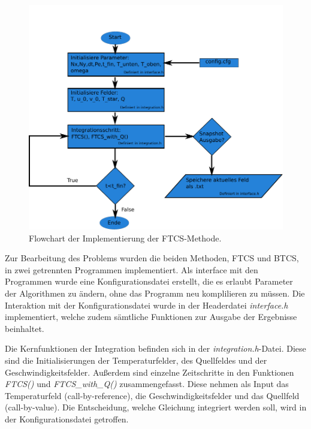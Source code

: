 \begin{figure}\centering
\includegraphics[height=0.45\textheight]{FTCSflow.pdf}\caption{Flowchart der Implementierung der FTCS-Methode.}\label{fig:FTCS}
\end{figure}

Zur Bearbeitung des Problems wurden die beiden Methoden, FTCS und BTCS, in zwei getrennten Programmen implementiert. Als interface mit den Programmen wurde eine Konfigurationsdatei erstellt, die es erlaubt Parameter der Algorithmen zu ändern, ohne das Programm neu komplilieren zu müssen.
Die Interaktion mit der Konfigurationsdatei wurde in der Headerdatei \emph{interface.h} implementiert, welche zudem sämtliche Funktionen zur Ausgabe der Ergebnisse beinhaltet.

Die Kernfunktionen der Integration befinden sich in der \emph{integration.h}-Datei. Diese sind die Initialisierungen der Temperaturfelder, des Quellfeldes und der Geschwindigkeitsfelder.
Außerdem sind einzelne Zeitschritte in den Funktionen \emph{FTCS()} und \emph{FTCS\_with\_Q()} zusammengefasst. Diese nehmen als Input das Temperaturfeld (call-by-reference), die Geschwindigkeitsfelder und das Quellfeld (call-by-value).
Die Entscheidung, welche Gleichung integriert werden soll, wird in der Konfigurationsdatei getroffen.
\FloatBarrier
\newpage

